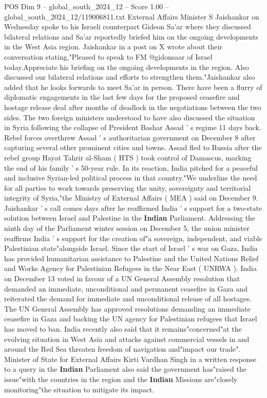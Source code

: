 \begin{textsample}{POS Dim 9 – global\_south\_2024\_12 – Score 1.00 – global\_south\_2024\_12/119006811.txt}  \label{ex:f9_pos_229}
External Affairs Minister S Jaishankar on Wednesday spoke to his Israeli counterpart Gideon Sa'ar where they discussed bilateral relations and Sa'ar reportedly briefed him on the ongoing developments in the West Asia region.
Jaishankar in a post on X wrote about their conversation stating,"Pleased to speak to FM @gidonsaar of Israel today.Appreciate his briefing on the ongoing developments in the region.
Also discussed our bilateral relations and efforts to strengthen them."Jaishankar also added that he looks forwards to meet Sa'ar in person.
There have been a flurry of diplomatic engagements in the last few days for the proposed ceasefire and hostage release deal after months of deadlock in the negotiations between the two sides.
The two foreign ministers understood to have also discussed the situation in Syria following the collapse of President Bashar Assad ' s regime 11 days back.
Rebel forces overthrew Assad ' s authoritarian government on December 8 after capturing several other prominent cities and towns.
Assad fled to Russia after the rebel group Hayat Tahrir al-Sham ( HTS ) took control of Damascus, marking the end of his family ' s 50-year rule.
In its reaction, India pitched for a peaceful and inclusive Syrian-led political process in that country."We underline the need for all parties to work towards preserving the unity, sovereignty and territorial integrity of Syria,"the Ministry of External Affairs ( MEA ) said on December 9.
Jaishankar ' s call comes days after he reaffirmed India ' s support for a two-state solution between Israel and Palestine in the \textbf{Indian} Parliament.
Addressing the ninth day of the Parliament winter session on December 5, the union minister reaffirms India ' s support for the creation of"a sovereign, independent, and viable Palestinian state"alongside Israel.
Since the start of Israel ' s war on Gaza, India has provided humanitarian assistance to Palestine and the United Nations Relief and Works Agency for Palestinian Refugees in the Near East ( UNRWA ).
India on December 13 voted in favour of a UN General Assembly resolution that demanded an immediate, unconditional and permanent ceasefire in Gaza and reiterated the demand for immediate and unconditional release of all hostages.
The UN General Assembly has approved resolutions demanding an immediate ceasefire in Gaza and backing the UN agency for Palestinian refugees that Israel has moved to ban.
India recently also said that it remains"concerned"at the evolving situation in West Asia and attacks against commercial vessels in and around the Red Sea threaten freedom of navigation and"impact our trade".
Minister of State for External Affairs Kirti Vardhan Singh in a written response to a query in the \textbf{Indian} Parliament also said the government has"raised the issue"with the countries in the region and the \textbf{Indian} Missions are"closely monitoring"the situation to mitigate its impact.

\end{textsample}
